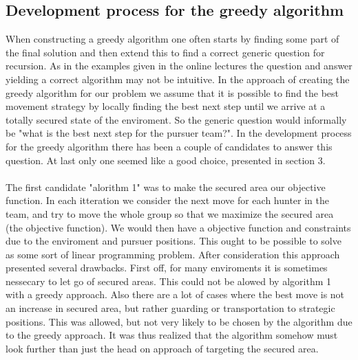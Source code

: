   

\subsection{Development process for the greedy algorithm}
When constructing a greedy algorithm one often starts by finding some part of the final solution and then extend this to find a correct generic question for recursion. As in the examples given in the online lectures \cite{online lecture} the question and answer yielding a correct algorithm may not be intuitive. In the approach of creating the greedy algorithm for our problem we assume that it is possible to find the best movement strategy by locally finding the best next step until we arrive at a totally secured state of the enviroment. So the generic question would informally be "what is the best next step for the pursuer team?". In the development process for the greedy algorithm there has been a couple of candidates to answer this question. At last only one seemed like a good choice, presented in section 3.
\\
\\The first candidate "alorithm 1" was to make the secured area our objective function. In each itteration we consider the next move for each hunter in the team, and try to move the whole group so that we maximize the secured area (the objective function). We would then have a objective function and constraints due to the enviroment and pursuer positions. This ought to be possible to solve as some sort of linear programming problem. After consideration this approach presented several drawbacks. First off, for many enviroments it is sometimes nessecary to let go of secured areas. This could not be alowed by algorithm 1 with a greedy approach. Also there are a lot of cases where the best move is not an increase in secured area, but rather guarding or transportation to strategic positions. This was allowed, but not very likely to be chosen by the algorithm due to the greedy approach. It was thus realized that the algorithm somehow must look further than just the head on approach of targeting the secured area.
